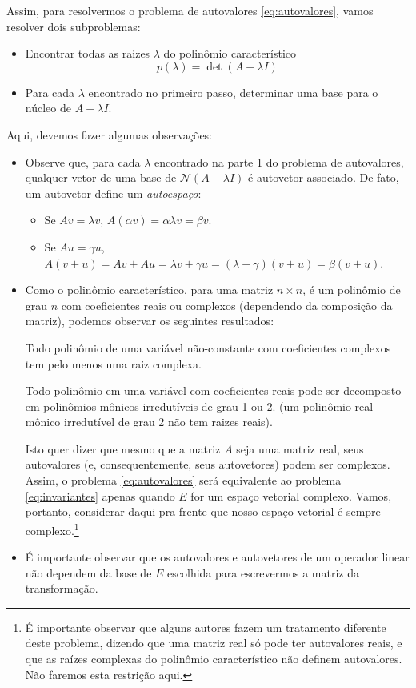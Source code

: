 Assim, para resolvermos o problema de autovalores \eqref{eq:autovalores}, vamos resolver dois subproblemas:
\begin{itemize}
	\item[1.] Encontrar todas as raizes $\lambda$ do polinômio característico
    \begin{equation*}
    	p(\lambda)=\det(A-\lambda I)
    \end{equation*}
    \item[2.] Para cada $\lambda$ encontrado no primeiro passo, determinar uma base para o núcleo de $A-\lambda I$. 
\end{itemize}

Aqui, devemos fazer algumas observações:
\begin{itemize}
\item[(i)] Observe que, para cada $\lambda$ encontrado na parte 1 do problema de autovalores, qualquer vetor de uma base de ${\mathcal{N}}(A-\lambda I)$ é autovetor associado. De fato, um autovetor define um \emph{autoespaço}: 
\begin{itemize}
   \item Se $Av=\lambda v$, $A(\alpha v) = \alpha \lambda v = \beta v$. 
   \item Se $Au=\gamma u$, $A(v+u) = Av+Au = \lambda v + \gamma u = (\lambda + \gamma) (v+u) = \beta(v+u)$. 
\end{itemize}
\item Como o polinômio característico, para uma matriz $n\times n$, é um polinômio de grau $n$ com coeficientes reais ou complexos (dependendo da composição da matriz), podemos observar os seguintes resultados:
\begin{teo}
  Todo polinômio de uma variável não-constante com coeficientes complexos tem pelo menos uma raiz complexa.
\end{teo}

\begin{coro}
  Todo polinômio em uma variável com coeficientes reais pode ser decomposto em polinômios mônicos irredutíveis de grau 1 ou 2. (um polinômio real mônico irredutível de grau 2 não tem raizes reais).
\end{coro}
Isto quer dizer que mesmo que a matriz $A$ seja uma matriz real, seus autovalores (e, consequentemente, seus autovetores) podem ser complexos. Assim, o problema \eqref{eq:autovalores} será equivalente ao problema \eqref{eq:invariantes} apenas quando $E$ for um espaço vetorial complexo. Vamos, portanto, considerar daqui pra frente que nosso espaço vetorial é sempre complexo.\footnote{É importante observar que alguns autores fazem um tratamento diferente deste problema, dizendo que uma matriz real só pode ter autovalores reais, e que as raízes complexas do polinômio característico não definem autovalores. Não faremos esta restrição aqui.}

\item[(iii)] É importante observar que os autovalores e autovetores de um operador linear não dependem da base de $E$ escolhida para escrevermos a matriz da transformação.
\end{itemize}

